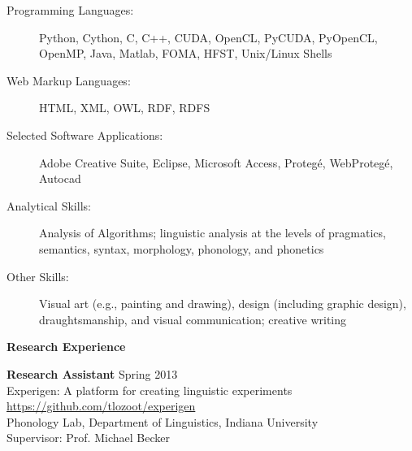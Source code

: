 \begin{singlespace}
\begin{description}
\item[Programming Languages:]
Python, Cython, C, C++, CUDA, OpenCL, PyCUDA, PyOpenCL, OpenMP, Java, Matlab, FOMA, HFST, Unix/Linux Shells 
\item[Web Markup Languages:] HTML, XML, OWL, RDF, RDFS
\item[Selected Software Applications:] Adobe Creative Suite, Eclipse, Microsoft Access, Proteg\'e, WebProteg\'e, Autocad
\item[Analytical Skills:] Analysis of Algorithms; linguistic analysis at the levels of pragmatics, semantics, syntax, morphology, phonology, and phonetics
\item[Other Skills:] %
Visual art (e.g., painting and drawing), design (including graphic design), draughtsmanship, and visual communication; creative writing
\end{description}
\vspace{21pt}
\centerline{\textbf{\Large Research Experience}}
\vspace{12pt}
\noindent\textbf{Research Assistant} \hfill Spring 2013 \\
\hspace{2ex} Experigen: A platform for creating linguistic experiments \\
\hspace{2ex} \url{https://github.com/tlozoot/experigen} \\
\hspace{2ex} Phonology Lab, Department of Linguistics, Indiana University \\
\hspace{2ex} Supervisor: Prof. Michael Becker
\begin{itemize} %

\end{itemize}
\end{singlespace}
